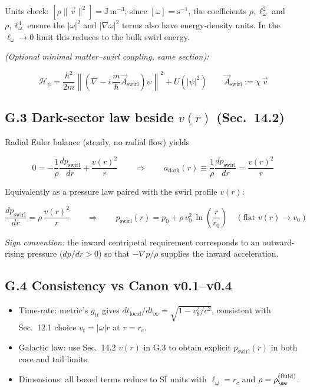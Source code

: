 \documentclass[11pt]{article}
\begin{document}
    Units check: $[\rho \lVert \vec{v} \rVert^2] = \text{J}\,\text{m}^{-3}$; since $[\omega] = \text{s}^{-1}$, the coefficients $\rho, \ell_\omega^2$ and $\rho, \ell_\omega^4$ ensure the $|\omega|^2$ and $|\nabla \omega|^2$ terms also have energy-density units. In the $\ell_\omega \to 0$ limit this reduces to the bulk swirl energy.

    \textit{(Optional minimal matter--swirl coupling, same section):}

    \[
        \boxed{
            \mathcal{H}_\psi = \frac{\hbar^2}{2m} \left\lVert \left(\nabla - i\,\frac{m}{\hbar} \vec{A}_{\text{swirl}}\right) \psi \right\rVert^2 + U(|\psi|^2)
        }
        \qquad \vec{A}_{\text{swirl}} := \chi\,\vec{v}
    \]

    \subsection*{G.3 Dark-sector law beside $v(r)$ (Sec.~14.2)}

    Radial Euler balance (steady, no radial flow) yields

    \[
        0 = -\frac{1}{\rho} \frac{dp_{\text{swirl}}}{dr} + \frac{v(r)^2}{r}
        \qquad \Rightarrow \qquad
        \boxed{
            a_{\text{dark}}(r) \equiv \frac{1}{\rho} \frac{dp_{\text{swirl}}}{dr} = \frac{v(r)^2}{r}
        }
    \]

    Equivalently as a pressure law paired with the swirl profile $v(r)$:

    \[
        \boxed{
            \frac{dp_{\text{swirl}}}{dr} = \rho\,\frac{v(r)^2}{r}
        }
        \qquad \Longrightarrow \qquad
        \boxed{
            p_{\text{swirl}}(r) = p_0 + \rho\,v_0^2\,\ln\left(\frac{r}{r_0}\right)
        }
        \quad (\text{flat } v(r) \to v_0)
    \]

    \textit{Sign convention:} the inward centripetal requirement corresponds to an outward-rising pressure ($dp/dr > 0$) so that $-\nabla p/\rho$ supplies the inward acceleration.

    \subsection*{G.4 Consistency vs Canon v0.1--v0.4}

    \begin{itemize}
        \item Time-rate: metric's $g_{tt}$ gives $dt_{\text{local}}/dt_\infty = \sqrt{1- v_\theta^2/c^2}$, consistent with Sec.~12.1 choice $v_t = |\omega| r$ at $r = r_c$.
        \item Galactic law: use Sec.~14.2 $v(r)$ in G.3 to obtain explicit $p_{\text{swirl}}(r)$ in both core and tail limits.
        \item Dimensions: all boxed terms reduce to SI units with $\ell_\omega = r_c$ and $\rho = \rho_{\ae}^{(\text{fluid})}$.
    \end{itemize}
\end{document}
